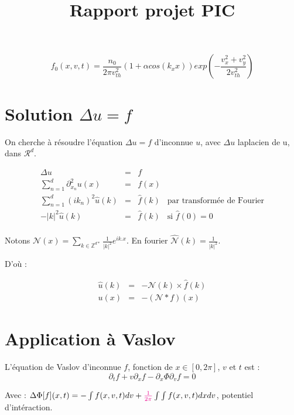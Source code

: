 \documentclass[a4paper,11pt]{article}
\title{Rapport projet PIC}
\newcommand{\carybe}[1]{ \textcolor{magenta}{#1}}
\begin{document}
\maketitle
$$
f_0(x,v,t) = \frac{n_0}{2 \pi v_{th}^2} ( 1 + \alpha cos(k_x x))
 exp( - \frac{v_x^2+v_y^2}{2 v_{th}^2})$$

\section{Solution $\Delta u = f$}
\label{delta u}

On cherche à résoudre l'équation $\Delta u = f$ d'inconnue $u$, avec $\Delta u$ laplacien de u, dans $\mathcal{R}^d$.

$$
\begin{array}{rclr}

\Delta u &=& f \\

\sum\limits_{n=1}^d {\partial^2_ {x_n}} u(x) &=& f(x) \\

\sum\limits_{n=1}^d (ik_n)^2 \widehat{u}(k) &=& \widehat{f}(k) & \text{par transformée de Fourier} \\

-|k|^2  \widehat{u}(k) &=& \widehat{f}(k) & \text{si } \widehat{f}(0)=0 \\

\end{array}
$$

Notons $\mathcal{N} (x) = \sum\limits _{k \in \mathbb{Z}^{d*}} \frac{1}{|k|^2} e^{ik.x}$. En fourier $\widehat{\mathcal{N}}(k) = \frac{1}{|k|^2}$.

D'où :

$$
\begin{array}{rclr}

\widehat{u} (k) &=& - \mathcal{N}(k) \times \widehat{f} (k) \\

u(x) &=& - (\mathcal{N} \ast f) (x)

\end{array}
$$

\section{Application à Vaslov}

L'équation de Vaslov d'inconnue $f$, fonction de $x \in [0, 2 \pi]$, $v$ et $t$ est :
$$
\partial_t f + v \partial_x f - \partial_ x \Phi \partial_v f = 0
$$

Avec : $\Delta \Phi [f](x,t) =  - \int f(x,v,t) dv +  \carybe{\frac{1}{2 \pi}} \int \int f(x, v , t) dx dv$, potentiel d'intéraction.
\end{document}
